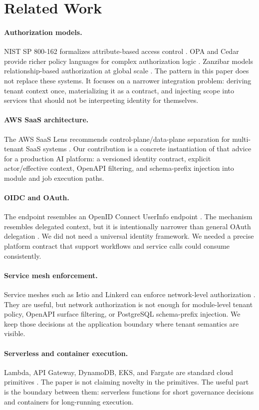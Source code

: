 \section{Related Work}
\label{sec:related-work}

\paragraph{Authorization models.}
NIST SP 800-162 formalizes attribute-based access control \cite{nist_sp800162}. OPA and Cedar provide richer policy languages for complex authorization logic \cite{opa_docs,cedar_docs}. Zanzibar models relationship-based authorization at global scale \cite{zanzibar}. The pattern in this paper does not replace these systems. It focuses on a narrower integration problem: deriving tenant context once, materializing it as a contract, and injecting scope into services that should not be interpreting identity for themselves.

\paragraph{AWS SaaS architecture.}
The AWS SaaS Lens recommends control-plane/data-plane separation for multi-tenant SaaS systems \cite{aws_saas_lens}. Our contribution is a concrete instantiation of that advice for a production AI platform: a versioned identity contract, explicit actor/effective context, OpenAPI filtering, and schema-prefix injection into module and job execution paths.

\paragraph{OIDC and OAuth.}
The  endpoint resembles an OpenID Connect UserInfo endpoint \cite{oidc_core}. The \viewas{} mechanism resembles delegated context, but it is intentionally narrower than general OAuth delegation \cite{oauth2}. We did not need a universal identity framework. We needed a precise platform contract that support workflows and service calls could consume consistently.

\paragraph{Service mesh enforcement.}
Service meshes such as Istio and Linkerd can enforce network-level authorization \cite{istio_authz,linkerd_policy}. They are useful, but network authorization is not enough for module-level tenant policy, OpenAPI surface filtering, or PostgreSQL schema-prefix injection. We keep those decisions at the application boundary where tenant semantics are visible.

\paragraph{Serverless and container execution.}
Lambda, API Gateway, DynamoDB, EKS, and Fargate are standard cloud primitives \cite{aws_lambda_docs,aws_api_gateway,dynamodb_docs,eks_docs,fargate_docs}. The paper is not claiming novelty in the primitives. The useful part is the boundary between them: serverless functions for short governance decisions and containers for long-running execution.
